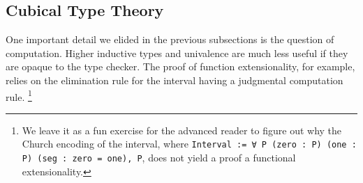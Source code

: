 
\subsection{Cubical Type Theory}\label{sec:fixes:theory:cubical}\label{sec:cubical}
One important detail we elided in the previous subsections is the question of computation.
Higher inductive types and univalence are much less useful if they are opaque to the type checker.
The proof of function extensionality, for example, relies on the elimination rule for the interval having a judgmental computation rule.%
\footnote{%
  We leave it as a fun exercise for the advanced reader to figure out why the Church encoding of the interval, where \texttt{Interval := ∀ P (zero : P) (one : P) (seg : zero = one), P}, does not yield a proof a functional extensionality.%
}

